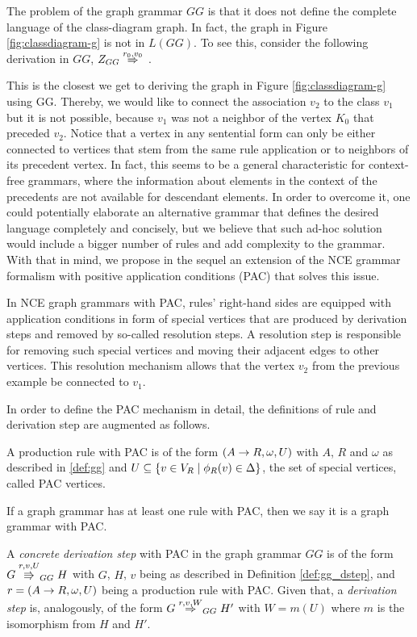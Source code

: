 The problem of the graph grammar $GG$ is that it does not define the complete language of the class-diagram graph. In fact, the graph in Figure \ref{fig:classdiagram-g} is not in $L(GG)$. To see this, consider the following derivation in $GG$, $\startG{GG} \deriv{r_0}{v_0}{}$
.

This is the closest we get to deriving the graph in Figure \ref{fig:classdiagram-g} using GG. Thereby, we would like to connect the association $v_2$ to the class $v_1$ but it is not possible, because $v_1$ was not a neighbor of the vertex $K_0$ that preceded $v_2$. Notice that a vertex in any sentential form can only be either connected to vertices that stem from the same rule application or to neighbors of its precedent vertex. In fact, this seems to be a general characteristic for context-free grammars, where the information about elements in the context of the precedents are not available for descendant elements. In order to overcome it, one could potentially elaborate an alternative grammar that defines the desired language completely and concisely, but we believe that such ad-hoc solution would include a bigger number of rules and add complexity to the grammar. With that in mind, we propose in the sequel an extension of the NCE grammar formalism with positive application conditions (PAC) that solves this issue. 

In NCE graph grammars with PAC, rules' right-hand sides are equipped with application conditions in form of special vertices that are produced by derivation steps and removed by so-called resolution steps. A resolution step is responsible for removing such special vertices and moving their adjacent edges to other vertices. This resolution mechanism allows that the vertex $v_2$ from the previous example be connected to $v_1$. 

In order to define the PAC mechanism in detail, the definitions of rule and derivation step are augmented as follows.

\begin{definition}
	A production rule with PAC is of the form $(A \to R, \omega, U)$ with $A$, $R$ and $\omega$ as described in \ref{def:gg} and $U \subseteq \{v \in V_R \; | \; \phi_R(v) \in \Delta\}$, the set of special vertices, called PAC vertices.
\end{definition}

If a graph grammar has at least one rule with PAC, then we say it is a graph grammar with PAC.

\begin{definition}
	A \textit{concrete derivation step} with PAC in the graph grammar $GG$ is of the form $G \overset{r,v,U}{\Rrightarrow}_{GG} H$ with $G$, $H$, $v$ being as described in Definition \ref{def:gg_dstep}, and $r = (A \to R, \omega, U)$ being a production rule with PAC. Given that, a \textit{derivation step} is, analogously, of the form $G \overset{r,v,W}{\Rightarrow}_{GG} H'$ with $W = m(U)$ where $m$ is the isomorphism from $H$ and $H'$.
\end{definition}

